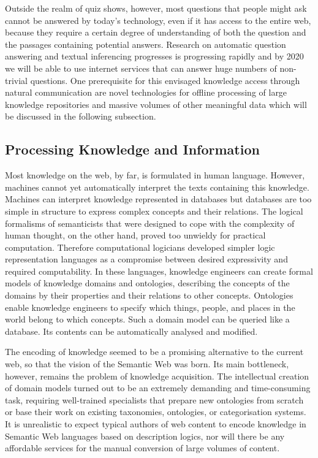 \documentclass[10pt, plain]{../../metanetpaper}
\begin{document}
\begin{multicols}{2}
Outside the realm of quiz shows, however, most questions that people might ask cannot be answered by today’s technology, even if it has access to the entire web, because they require a certain degree of understanding of both the question and the passages containing potential answers. Research on automatic question answering and textual inferencing progresses is progressing rapidly and by 2020 we will be able to use internet services that can answer huge numbers of non-trivial questions. One prerequisite for this envisaged knowledge access through natural communication are novel technologies for offline processing of large knowledge repositories and massive volumes of other meaningful data which will be discussed in the following subsection.  

\subsection{Processing Knowledge and Information}
\label{sec:proc-knowl-inform}

Most knowledge on the web, by far, is formulated in human language. However, machines cannot yet automatically interpret the texts containing this knowledge. Machines can interpret knowledge represented in databases but databases are too simple in structure to express complex concepts and their relations. The logical formalisms of semanticists that were designed to cope with the complexity of human thought, on the other hand, proved too unwieldy for practical computation. Therefore computational logicians developed simpler logic representation languages as a compromise between desired expressivity and required computability. In these languages, knowledge engineers can create formal models of knowledge domains and ontologies, describing the concepts of the domains by their properties and their relations to other concepts. Ontologies enable knowledge engineers to specify which things, people, and places in the world belong to which concepts. Such a domain model can be queried like a database. Its contents can be automatically analysed and modified. 
 
The encoding of knowledge seemed to be a promising alternative to the current web, so that the vision of the Semantic Web was born. Its main bottleneck, however, remains the problem of knowledge acquisition. The intellectual creation of domain models turned out to be an extremely demanding and time-consuming task, requiring well-trained specialists that prepare new ontologies from scratch or base their work on existing taxonomies, ontologies, or categorisation systems. It is unrealistic to expect typical authors of web content to encode knowledge in Semantic Web languages based on description logics, nor will there be any affordable services for the manual conversion of large volumes of content.
 

\end{multicols}
\end{document}
